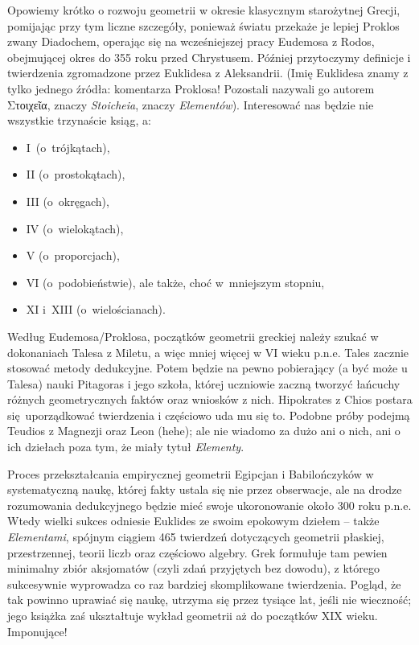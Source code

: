 %

Opowiemy krótko o rozwoju geometrii w okresie klasycznym starożytnej Grecji, pomijając przy tym liczne szczegóły, ponieważ światu przekaże je lepiej Proklos zwany Diadochem, operając się na wcześniejszej pracy  Eudemosa z Rodos, obejmującej okres do 355 roku przed Chrystusem.
%
%
Później przytoczymy definicje i twierdzenia zgromadzone przez Euklidesa z Aleksandrii.
(Imię Euklidesa znamy z tylko jednego źródła: komentarza Proklosa!
Pozostali nazywali go autorem Στοιχεῖα, znaczy \emph{Stoicheia}, znaczy \emph{Elementów}).
Interesować nas będzie nie wszystkie trzynaście ksiąg, a:
\begin{itemize}
\item I~(o~trójkątach),
\item II (o~prostokątach),
\item III (o~okręgach),
\item IV (o~wielokątach),
\item V (o~proporcjach),
\item VI (o~podobieństwie), ale także, choć w~mniejszym stopniu,
\item XI i~XIII (o~wielościanach).
\end{itemize}

Według Eudemosa/Proklosa, początków geometrii greckiej należy szukać w dokonaniach Talesa z Miletu, a więc mniej więcej w VI wieku p.n.e.
Tales zacznie stosować metody dedukcyjne.
%
Potem będzie na pewno pobierający (a być może u Talesa) nauki Pitagoras i jego szkoła, której uczniowie zaczną tworzyć łańcuchy różnych geometrycznych faktów oraz wniosków z nich. 
%
Hipokrates z Chios postara się uporządkować twierdzenia i częściowo uda mu się to.
%
Podobne próby podejmą Teudios z Magnezji oraz Leon (hehe); ale nie wiadomo za dużo ani o nich, ani o ich dziełach poza tym, że miały tytuł \emph{Elementy}.
%
%

Proces przekształcania empirycznej geometrii Egipcjan i Babilończyków w systematyczną naukę, której fakty ustala się nie przez obserwacje, ale na drodze rozumowania dedukcyjnego będzie mieć swoje ukoronowanie około 300 roku p.n.e.
Wtedy wielki sukces odniesie Euklides ze swoim epokowym dziełem -- także \emph{Elementami}, spójnym ciągiem 465 twierdzeń dotyczących geometrii płaskiej, przestrzennej, teorii liczb oraz częściowo algebry.
Grek formułuje tam pewien minimalny zbiór aksjomatów (czyli zdań przyjętych bez dowodu), z którego sukcesywnie wyprowadza co raz bardziej skomplikowane twierdzenia.
Pogląd, że tak powinno uprawiać się naukę, utrzyma się przez tysiące lat, jeśli nie wieczność; jego książka zaś ukształtuje wykład geometrii aż do początków XIX wieku.
Imponujące!


